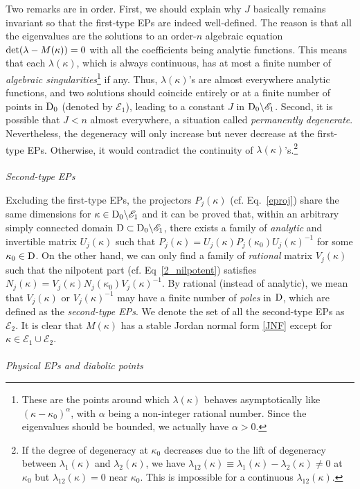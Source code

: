 \documentclass{tADP2e}
\theoremstyle{plain}
\theoremstyle{plain}
\theoremstyle{definition}
\begin{document}
Two remarks are in order. First, we should explain why $J$ basically remains invariant so that the first-type EPs are indeed well-defined. The reason is that all the eigenvalues are the solutions to an order-$n$ algebraic equation ${\rm det}(\lambda-M(\kappa))=0$ with all the coefficients being analytic functions. This means that each $\lambda(\kappa)$, which is always continuous, has at most a finite number of \emph{algebraic singularities}\footnote{These are the points around which $\lambda(\kappa)$ behaves asymptotically like $(\kappa-\kappa_0)^\alpha$, with $\alpha$ being a non-integer rational number. Since the eigenvalues should be bounded, we actually have $\alpha>0$.} if any. Thus, $\lambda(\kappa)$'s are almost everywhere analytic functions, and two solutions should coincide entirely or at a finite number of points in ${\rm D}_0$ (denoted by $\mathscr{E}_1$), leading to a constant $J$ in ${\rm D_0}\backslash\mathscr{E}_1$. Second, it is possible that $J<n$ almost everywhere, a situation called \emph{permanently degenerate}. Nevertheless, the degeneracy will only increase but never decrease at the first-type EPs. Otherwise, it would contradict the continuity of $\lambda(\kappa)$'s.\footnote{If the degree of degeneracy at $\kappa_0$ decreases due to the lift of degeneracy between $\lambda_1(\kappa)$ and $\lambda_2(\kappa)$, we have $\lambda_{12}(\kappa)\equiv\lambda_1(\kappa)-\lambda_2(\kappa)\neq0$ at $\kappa_0$ but $\lambda_{12}(\kappa)=0$ near $\kappa_0$. This is impossible for a continuous $\lambda_{12}(\kappa)$.} 
\\
\\
{\it Second-type EPs}

\vspace{3pt}
\noindent 
Excluding the first-type EPs, the projectors $P_j(\kappa)$ (cf. Eq.~\eqref{eproj}) share the same dimensions for $\kappa\in{\rm D_0}\backslash\mathscr{E}_1$ and it can be proved that, within an arbitrary simply connected domain ${\rm D}\subset{\rm D_0}\backslash\mathscr{E}_1$, there exists a family of \emph{analytic} and invertible matrix $U_j(\kappa)$ such that $P_j(\kappa)=U_j(\kappa)P_j(\kappa_0)U_j(\kappa)^{-1}$ for some $\kappa_0\in{\rm D}$. On the other hand, we can only find a family of \emph{rational} matrix $V_j(\kappa)$ such that the nilpotent part (cf. Eq~\eqref{2_nilpotent}) satisfies $N_j(\kappa)=V_j(\kappa)N_j(\kappa_0)V_j(\kappa)^{-1}$. By rational (instead of analytic), we mean that $V_j(\kappa)$ or $V_j(\kappa)^{-1}$ may have a finite number of \emph{poles} in ${\rm D}$, which are defined as the \emph{second-type  EPs}. We denote the set of all the second-type EPs  
as $\mathscr{E}_2$. It is clear that $M(\kappa)$ has a stable Jordan normal form \eqref{JNF} except for $\kappa\in\mathscr{E}_1\cup\mathscr{E}_2$. 
\\
\\
{\it Physical EPs and diabolic points}
\end{document}
